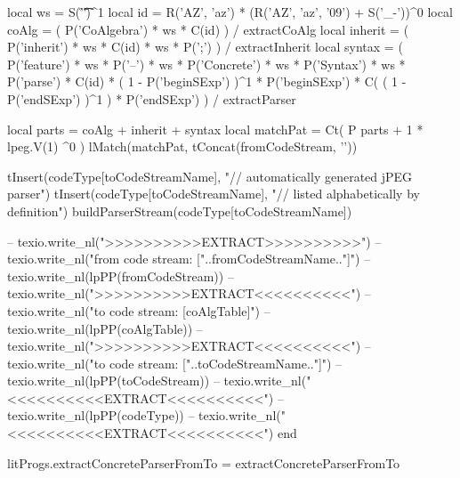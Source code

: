   local ws       = S('\r\n\f\t ')^1
  local id       = R('AZ', 'az') * (R('AZ', 'az', '09') + S('_-'))^0
  local coAlg    = ( P('CoAlgebra') * ws * C(id) ) / extractCoAlg
  local inherit  = ( P('inherit') * ws * C(id) * ws * P(';') ) / extractInherit
  local syntax   = (
    P('feature') * ws * P('--') * ws * P('Concrete') * ws * P('Syntax') * ws *
    P('parse') * C(id) * ( 1 - P('beginSExp') )^1 *  P('beginSExp') *
    C( ( 1 - P('endSExp') )^1 ) * P('endSExp')
    ) / extractParser

  local parts    = coAlg + inherit + syntax
  local matchPat = Ct( P{ parts + 1 * lpeg.V(1) }^0 )
  lMatch(matchPat, tConcat(fromCodeStream, '\n\n'))
  
  tInsert(codeType[toCodeStreamName], "// automatically generated jPEG parser")
  tInsert(codeType[toCodeStreamName], "// listed alphabetically by definition")
  buildParserStream(codeType[toCodeStreamName])
  
--  texio.write_nl(">>>>>>>>>>EXTRACT>>>>>>>>>>")
--  texio.write_nl("from code stream: ["..fromCodeStreamName.."]")
--  texio.write_nl(lpPP(fromCodeStream))
--  texio.write_nl(">>>>>>>>>>EXTRACT<<<<<<<<<<")
--  texio.write_nl("to code stream: [coAlgTable]")
--  texio.write_nl(lpPP(coAlgTable))
--  texio.write_nl(">>>>>>>>>>EXTRACT<<<<<<<<<<")
--  texio.write_nl("to code stream: ["..toCodeStreamName.."]")
--  texio.write_nl(lpPP(toCodeStream))  
--  texio.write_nl("<<<<<<<<<<EXTRACT<<<<<<<<<<\n")
--  texio.write_nl(lpPP(codeType))
--  texio.write_nl("<<<<<<<<<<EXTRACT<<<<<<<<<<\n")
end

litProgs.extractConcreteParserFromTo = extractConcreteParserFromTo
\stopLuaCode


